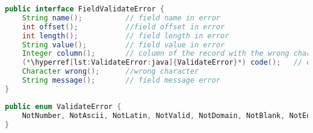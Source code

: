 \documentclass[a4paper,10pt]{report}
\begin{document}
\begin{figure*}[!htb]
\begin{lstlisting}[language=java, 
caption={dettaglio errore \texttt{FieldValidateError}}, 
label=lst:FieldValidateError:java]
public interface FieldValidateError {
    String name();          // field name in error
    int offset();           //field offset in error
    int length();           // field length in error
    String value();         // field value in error
    Integer column();       // column of the record with the wrong character
    (*\hyperref[lst:ValidateError:java]{ValidateError}*) code();   // error category
    Character wrong();      //wrong character
    String message();       // field message error
}
\end{lstlisting}
\end{figure*}

\begin{figure*}[!htb]
\begin{lstlisting}[language=java, 
caption={categoria errore \texttt{ValidateError}}, 
label=lst:ValidateError:java]
public enum ValidateError {
    NotNumber, NotAscii, NotLatin, NotValid, NotDomain, NotBlank, NotEqual, NotMatch, NotDigitBlank
}
\end{lstlisting}
\end{figure*}



%
\printindex
\end{document}
